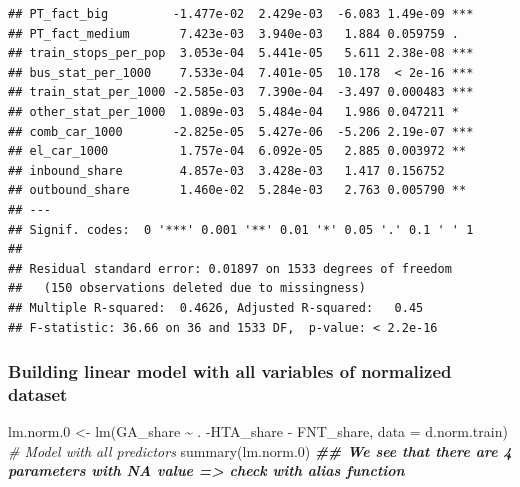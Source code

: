 \documentclass[
]{article}
\newenvironment{Shaded}{\begin{snugshade}}{\end{snugshade}}
\newcommand{\AttributeTok}[1]{\textcolor[rgb]{0.77,0.63,0.00}{#1}}
\newcommand{\CommentTok}[1]{\textcolor[rgb]{0.56,0.35,0.01}{\textit{#1}}}
\newcommand{\DocumentationTok}[1]{\textcolor[rgb]{0.56,0.35,0.01}{\textbf{\textit{#1}}}}
\newcommand{\FloatTok}[1]{\textcolor[rgb]{0.00,0.00,0.81}{#1}}
\newcommand{\FunctionTok}[1]{\textcolor[rgb]{0.00,0.00,0.00}{#1}}
\newcommand{\NormalTok}[1]{#1}
\newcommand{\OtherTok}[1]{\textcolor[rgb]{0.56,0.35,0.01}{#1}}
\newcommand{\SpecialCharTok}[1]{\textcolor[rgb]{0.00,0.00,0.00}{#1}}
\begin{document}
\begin{verbatim}
## PT_fact_big         -1.477e-02  2.429e-03  -6.083 1.49e-09 ***
## PT_fact_medium       7.423e-03  3.940e-03   1.884 0.059759 .  
## train_stops_per_pop  3.053e-04  5.441e-05   5.611 2.38e-08 ***
## bus_stat_per_1000    7.533e-04  7.401e-05  10.178  < 2e-16 ***
## train_stat_per_1000 -2.585e-03  7.390e-04  -3.497 0.000483 ***
## other_stat_per_1000  1.089e-03  5.484e-04   1.986 0.047211 *  
## comb_car_1000       -2.825e-05  5.427e-06  -5.206 2.19e-07 ***
## el_car_1000          1.757e-04  6.092e-05   2.885 0.003972 ** 
## inbound_share        4.857e-03  3.428e-03   1.417 0.156752    
## outbound_share       1.460e-02  5.284e-03   2.763 0.005790 ** 
## ---
## Signif. codes:  0 '***' 0.001 '**' 0.01 '*' 0.05 '.' 0.1 ' ' 1
## 
## Residual standard error: 0.01897 on 1533 degrees of freedom
##   (150 observations deleted due to missingness)
## Multiple R-squared:  0.4626, Adjusted R-squared:   0.45 
## F-statistic: 36.66 on 36 and 1533 DF,  p-value: < 2.2e-16
\end{verbatim}

\begin{Shaded}
\end{Shaded}

\hypertarget{building-linear-model-with-all-variables-of-normalized-dataset}{%
\subsubsection{Building linear model with all variables of normalized
dataset}\label{building-linear-model-with-all-variables-of-normalized-dataset}}

\begin{Shaded}
\begin{Highlighting}[]
\NormalTok{lm.norm}\FloatTok{.0} \OtherTok{\textless{}{-}} \FunctionTok{lm}\NormalTok{(GA\_share }\SpecialCharTok{\textasciitilde{}}\NormalTok{ . }\SpecialCharTok{{-}}\NormalTok{HTA\_share }\SpecialCharTok{{-}}\NormalTok{ FNT\_share, }\AttributeTok{data =}\NormalTok{ d.norm.train) }\CommentTok{\# Model with all predictors}
\FunctionTok{summary}\NormalTok{(lm.norm}\FloatTok{.0}\NormalTok{) }\DocumentationTok{\#\# We see that there are 4 parameters with NA value =\textgreater{} check with alias function}
\end{Highlighting}
\end{Shaded}
\end{document}
